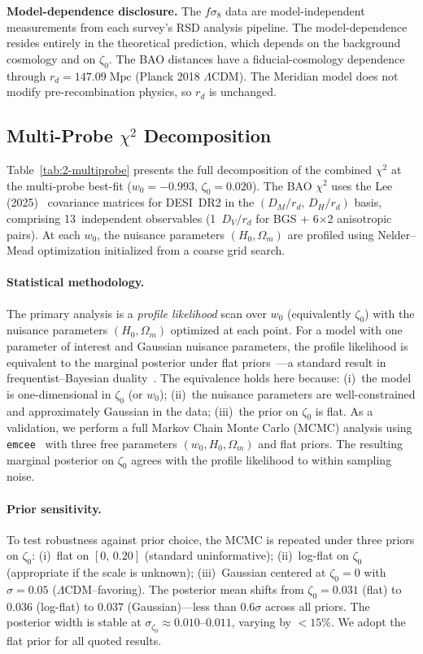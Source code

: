 \textbf{Model-dependence disclosure.} The $f\sigma_8$ data are model-independent measurements from each survey's RSD analysis pipeline. The model-dependence resides entirely in the theoretical prediction, which depends on the background cosmology and on $\zeta_0$. The BAO distances have a fiducial-cosmology dependence through $r_d = 147.09\;\mathrm{Mpc}$ (Planck 2018 $\Lambda$CDM). The Meridian model does not modify pre-recombination physics, so $r_d$ is unchanged.

\subsection{Multi-Probe $\chi^2$ Decomposition}
\label{sec:2-multiprobe-chi2}

Table~\ref{tab:2-multiprobe} presents the full decomposition of the combined $\chi^2$ at the multi-probe best-fit ($w_0 = -0.993$, $\zeta_0 = 0.020$). The BAO $\chi^2$ uses the Lee (2025)~\cite{ch2:Lee2025} covariance matrices for DESI~DR2 in the $(D_M/r_d,\, D_H/r_d)$ basis, comprising 13~independent observables (1~$D_V/r_d$ for BGS + 6$\times$2 anisotropic pairs). At each $w_0$, the nuisance parameters $(H_0, \Omega_m)$ are profiled using Nelder--Mead optimization initialized from a coarse grid search.

\paragraph{Statistical methodology.} The primary analysis is a \emph{profile likelihood} scan over $w_0$ (equivalently $\zeta_0$) with the nuisance parameters $(H_0, \Omega_m)$ optimized at each point. For a model with one parameter of interest and Gaussian nuisance parameters, the profile likelihood is equivalent to the marginal posterior under flat priors~\cite{ch2:Rolke2005}---a standard result in frequentist--Bayesian duality~\cite{ch2:Reid2010}. The equivalence holds here because: (i)~the model is one-dimensional in $\zeta_0$ (or $w_0$); (ii)~the nuisance parameters are well-constrained and approximately Gaussian in the data; (iii)~the prior on $\zeta_0$ is flat. As a validation, we perform a full Markov Chain Monte Carlo (MCMC) analysis using \texttt{emcee}~\cite{ch2:ForemanMackey2013} with three free parameters $(w_0, H_0, \Omega_m)$ and flat priors. The resulting marginal posterior on $\zeta_0$ agrees with the profile likelihood to within sampling noise.

\paragraph{Prior sensitivity.} To test robustness against prior choice, the MCMC is repeated under three priors on $\zeta_0$: (i)~flat on $[0,\,0.20]$ (standard uninformative); (ii)~log-flat on $\zeta_0$ (appropriate if the scale is unknown); (iii)~Gaussian centered at $\zeta_0 = 0$ with $\sigma = 0.05$ ($\Lambda$CDM--favoring). The posterior mean shifts from $\zeta_0 = 0.031$ (flat) to $0.036$ (log-flat) to $0.037$ (Gaussian)---less than $0.6\sigma$ across all priors. The posterior width is stable at $\sigma_{\zeta_0} \approx 0.010$--$0.011$, varying by $<15\%$. We adopt the flat prior for all quoted results.

